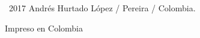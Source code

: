 \vspace*{14cm}
\textcopyright~2017 Andrés Hurtado López / Pereira / Colombia.

\vspace*{1cm}
Impreso en Colombia